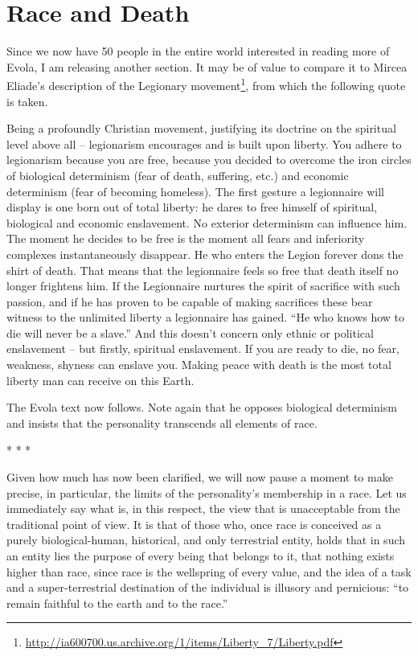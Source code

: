 \section{Race and Death}

Since we now have 50 people in the entire world interested in reading more of Evola, I am releasing another section. It may be of value to compare it to Mircea Eliade's description of the Legionary movement\footnote{\url{http://ia600700.us.archive.org/1/items/Liberty\_7/Liberty.pdf}}, from which the following quote is taken.

\begin{quotex}
Being a profoundly Christian movement, justifying its doctrine on the spiritual level above all -- legionarism encourages and is built upon liberty. You adhere to legionarism because you are free, because you decided to overcome the iron circles of biological determinism (fear of death, suffering, etc.) and economic determinism (fear of becoming homeless). The first gesture a legionnaire will display is one born out of total liberty: he dares to free himself of spiritual, biological and economic enslavement. No exterior determinism can influence him. The moment he decides to be free is the moment all fears and inferiority complexes instantaneously disappear. He who enters the Legion forever dons the shirt of death. That means that the legionnaire feels so free that death itself no longer frightens him. If the Legionnaire nurtures the spirit of sacrifice with such passion, and if he has proven to be capable of making sacrifices these bear witness to the unlimited liberty a legionnaire has gained. ``He who knows how to die will never be a slave.'' And this doesn't concern only ethnic or political enslavement -- but firstly, spiritual enslavement. If you are ready to die, no fear, weakness, shyness can enslave you. Making peace with death is the most total liberty man can receive on this Earth.
\end{quotex}


The Evola text now follows. Note again that he opposes biological determinism and insists that the personality transcends all elements of race.

\begin{center}* * *\end{center}


Given how much has now been clarified, we will now pause a moment to make precise, in particular, the limits of the personality's membership in a race. Let us immediately say what is, in this respect, the view that is unacceptable from the traditional point of view. It is that of those who, once race is conceived as a purely biological-human, historical, and only terrestrial entity, holds that in such an entity lies the purpose of every being that belongs to it, that nothing exists higher than race, since race is the wellspring of every value, and the idea of a task and a super-terrestrial destination of the individual is illusory and pernicious: ``to remain faithful to the earth and to the race.''


